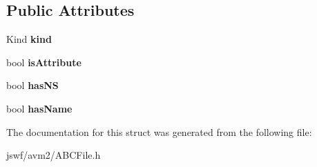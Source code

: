 \subsection*{Public Attributes}
\begin{DoxyCompactItemize}
\item 
\hypertarget{structjswf_1_1avm2_1_1_multiname_base_a031cd1e6ea95a42d2b27288b17587b2c}{Kind {\bfseries kind}}\label{structjswf_1_1avm2_1_1_multiname_base_a031cd1e6ea95a42d2b27288b17587b2c}

\item 
\hypertarget{structjswf_1_1avm2_1_1_multiname_base_a1e6c4c6635fff1225e1f70cab616f5bb}{bool {\bfseries is\+Attribute}}\label{structjswf_1_1avm2_1_1_multiname_base_a1e6c4c6635fff1225e1f70cab616f5bb}

\item 
\hypertarget{structjswf_1_1avm2_1_1_multiname_base_aa7e22c03dff1f686046006d8f434252e}{bool {\bfseries has\+N\+S}}\label{structjswf_1_1avm2_1_1_multiname_base_aa7e22c03dff1f686046006d8f434252e}

\item 
\hypertarget{structjswf_1_1avm2_1_1_multiname_base_a7d563f60053dec666c5fd30ffcbde8c6}{bool {\bfseries has\+Name}}\label{structjswf_1_1avm2_1_1_multiname_base_a7d563f60053dec666c5fd30ffcbde8c6}

\end{DoxyCompactItemize}


The documentation for this struct was generated from the following file\+:\begin{DoxyCompactItemize}
\item 
jswf/avm2/A\+B\+C\+File.\+h\end{DoxyCompactItemize}
